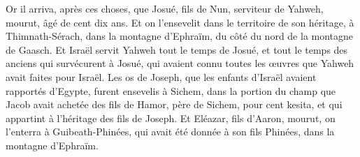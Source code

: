 \begin{multicols}{2}
Or il arriva, après ces choses, que Josué, fils de Nun, serviteur de Yahweh, mourut, âgé de cent dix ans.
Et on l'ensevelit dans le territoire de son héritage, à Thimnath-Sérach, dans la montagne d'Ephraïm, du côté du nord de la montagne de Gaasch.
Et Israël servit Yahweh tout le temps de Josué, et tout le temps des anciens qui survécurent à Josué, qui avaient connu toutes les œuvres que Yahweh avait faites pour Israël.
Les os de Joseph, que les enfants d'Israël avaient rapportés d'Egypte, furent ensevelis à Sichem, dans la portion du champ que Jacob avait achetée des fils de Hamor, père de Sichem, pour cent kesita, et qui appartint à l'héritage des fils de Joseph.
Et Eléazar, fils d'Aaron, mourut, on l'enterra à Guibeath-Phinées, qui avait été donnée à son fils Phinées, dans la montagne d'Ephraïm.
\PPE{}
\end{multicols}
